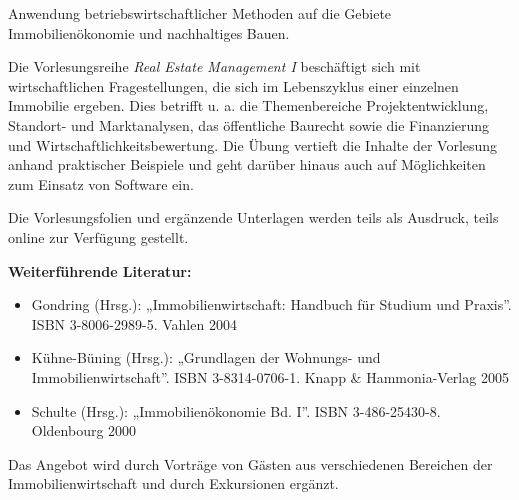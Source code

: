 \begin{course}
\begin{learningoutcomes}
Anwendung betriebswirtschaftlicher Methoden auf die Gebiete Immobilienökonomie und nachhaltiges Bauen.


\end{learningoutcomes}

\begin{content}
Die Vorlesungsreihe \emph{Real Estate Management I} beschäftigt sich mit wirtschaftlichen Fragestellungen, die sich im Lebenszyklus einer einzelnen Immobilie ergeben. Dies betrifft u. a. die Themenbereiche Projektentwicklung, Standort- und Marktanalysen, das öffentliche Baurecht sowie die Finanzierung und Wirtschaftlichkeitsbewertung.\newline
Die Übung vertieft die Inhalte der Vorlesung anhand praktischer Beispiele und geht darüber hinaus auch auf Möglichkeiten zum Einsatz von Software ein.


\end{content}

\begin{media}Die Vorlesungsfolien und ergänzende Unterlagen werden teils als Ausdruck, teils online zur Verfügung gestellt.

\end{media}

\begin{literature}\textbf{Weiterführende Literatur:}

 \begin{itemize}\item Gondring (Hrsg.): „Immobilienwirtschaft: Handbuch für Studium und Praxis”. ISBN 3-8006-2989-5. Vahlen 2004  \item Kühne-Büning (Hrsg.): „Grundlagen der Wohnungs- und Immobilienwirtschaft”. ISBN 3-8314-0706-1. Knapp \& Hammonia-Verlag 2005  \item Schulte (Hrsg.): „Immobilienökonomie Bd. I”. ISBN 3-486-25430-8. Oldenbourg 2000  \end{itemize}\end{literature}

\begin{remarks}Das Angebot wird durch Vorträge von Gästen aus verschiedenen Bereichen der Immobilienwirtschaft und durch Exkursionen ergänzt.

\end{remarks}

\end{course}